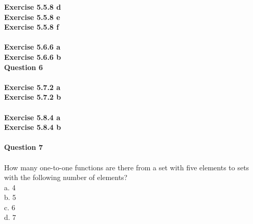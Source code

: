 \documentclass{article}
\begin{document}
\textbf{Exercise 5.5.8 d}\\
\textbf{Exercise 5.5.8 e}\\
\textbf{Exercise 5.5.8 f}\\\\
\textbf{Exercise 5.6.6 a}\\
\textbf{Exercise 5.6.6 b}\\
\newpage
\noindent \textbf{Question 6}\\\\
\textbf{Exercise 5.7.2 a}\\
\textbf{Exercise 5.7.2 b}\\\\
\textbf{Exercise 5.8.4 a}\\
\textbf{Exercise 5.8.4 b}\\\\
\newpage
\noindent \textbf{Question 7}\\\\
How many one-to-one functions are there from a set with five elements to sets with the following number of elements?\\
a. 4\\
b. 5\\
c. 6\\
d. 7\\
\end{document}
